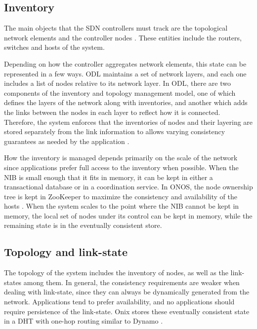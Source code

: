 \documentclass[letterpaper,twocolumn,10pt]{article}
\begin{document}
\subsection*{Inventory}

The main objects that the SDN controllers must track are the topological network elements and the controller nodes \cite{network2015topologies}. These entities include the routers, switches and hosts of the system.

Depending on how the controller aggregates network elements, this state can be represented in a few ways. ODL maintains a set of network layers, and each one includes a list of nodes relative to its network layer. In ODL, there are two components of the inventory and topology management model, one of which defines the layers of the network along with inventories, and another which adds the links between the nodes in each layer to reflect how it is connected.
Therefore, the system enforces that the inventories of nodes and their layering are stored separately from the link information to allows varying consistency guarantees as needed by the application \cite{ODL}.

How the inventory is managed depends primarily on the scale of the network since applications prefer full access to the inventory when possible. When the NIB is small enough that it fits in memory, it can be kept in either a transactional database or in a coordination service. In ONOS, the node ownership tree is kept in ZooKeeper to maximize the consistency and availability of the hosts \cite{berde2014onos}. When the system scales to the point where the NIB cannot be kept in memory, the local set of nodes under its control can be kept in memory, while the remaining state is in the eventually consistent store.

\subsection*{Topology and link-state}

The topology of the system includes the inventory of nodes, as well as the link-states among them. In general, the consistency requirements are weaker when dealing with link-state, since they can always be dynamically generated from the network. Applications tend to prefer availability, and no applications should require persistence of the link-state. Onix stores these eventually consistent state in a DHT with one-hop routing similar to Dynamo \cite{decandia2007dynamo}.
\end{document}

